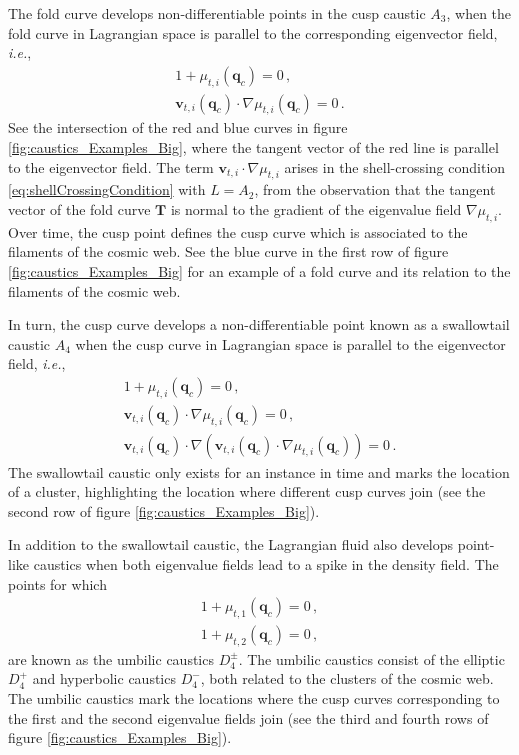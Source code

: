 \documentclass[a4paper, 11pt]{article}
\begin{document}
The fold curve develops non-differentiable points in the cusp caustic $A_3$, when the fold curve in Lagrangian space is parallel to the corresponding eigenvector field, \textit{i.e.}, 
\begin{align}
1+\mu_{t,i}(\bm{q}_c)=0\,,\\
\bm{v}_{t,i}(\bm{q}_c) \cdot \nabla \mu_{t,i}(\bm{q}_c)=0\,.\label{eq:cuspCondition}
\end{align}
See the intersection of the red and blue curves in figure \ref{fig:caustics_Examples_Big}, where the tangent vector of the red line is parallel to the eigenvector field. The term $\bm{v}_{t,i} \cdot \nabla \mu_{t,i}$ arises in the shell-crossing condition \eqref{eq:shellCrossingCondition} with $L=A_2$, from the observation that the tangent vector of the fold curve $\bm{T}$ is normal to the gradient of the eigenvalue field $\nabla \mu_{t,i}$. Over time, the cusp point defines the cusp curve which is associated to the filaments of the cosmic web. See the blue curve in the first row of figure \ref{fig:caustics_Examples_Big} for an example of a fold curve and its relation to the filaments of the cosmic web. 

In turn, the cusp curve develops a non-differentiable point known as a swallowtail caustic $A_4$ when the cusp curve in Lagrangian space is parallel to the eigenvector field, \textit{i.e.},
\begin{align}
1+\mu_{t,i}(\bm{q}_c)=0\,,\\
\bm{v}_{t,i}(\bm{q}_c) \cdot \nabla \mu_{t,i}(\bm{q}_c)=0\,,\\
\bm{v}_{t,i}(\bm{q}_c) \cdot \nabla (\bm{v}_{t,i}(\bm{q}_c) \cdot \nabla \mu_{t,i}(\bm{q}_c)) = 0\,.
\end{align}
The swallowtail caustic only exists for an instance in time and marks the location of a cluster, highlighting the location where different cusp curves join (see the second row of figure \ref{fig:caustics_Examples_Big}). 

In addition to the swallowtail caustic, the Lagrangian fluid also develops point-like caustics when both eigenvalue fields lead to a spike in the density field. The points for which
\begin{align}
1+\mu_{t,1}(\bm{q}_c) =0\,,\\
1+\mu_{t,2}(\bm{q}_c) = 0\,,
\end{align}
are known as the umbilic caustics $D_4^\pm$. The umbilic caustics consist of the elliptic $D_4^+$ and hyperbolic caustics $D_4^-$, both related to the clusters of the cosmic web. The umbilic caustics mark the locations where the cusp curves corresponding to the first and the second eigenvalue fields join (see the third and fourth rows of figure \ref{fig:caustics_Examples_Big}). 
\end{document}
